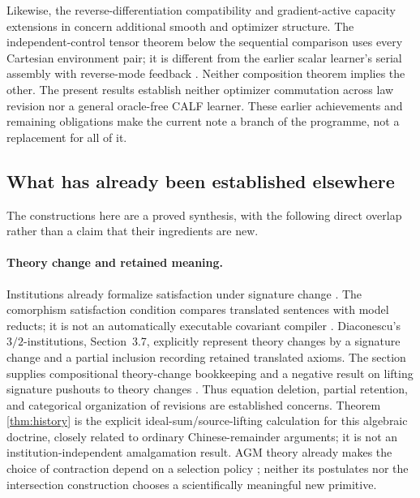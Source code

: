 \documentclass[11pt]{article}
\theoremstyle{definition}
\theoremstyle{remark}\newtheorem{remark}[theorem]{Remark}
\begin{document}
Likewise, the reverse-differentiation compatibility and gradient-active
capacity extensions in \cite{bridge-note,capacity-note} concern additional
smooth and optimizer structure. The independent-control tensor theorem
below the sequential comparison uses every Cartesian environment pair;
it is different from the earlier scalar learner's serial assembly with
reverse-mode feedback \cite{learning-note}. Neither composition theorem
implies the other. The present results establish neither optimizer
commutation across law revision nor a general oracle-free CALF learner.
These earlier achievements and remaining obligations make the current
note a branch of the programme, not a replacement for all of it.

\subsection{What has already been established elsewhere}
The constructions here are a proved synthesis, with the following direct
overlap rather than a claim that their ingredients are new.

\paragraph{Theory change and retained meaning.}
Institutions already formalize satisfaction under signature change
\cite{institutions}. The comorphism satisfaction condition compares
translated sentences with model reducts; it is not an automatically
executable covariant compiler \cite{institution-morphisms}.
Diaconescu's $3/2$-institutions, Section~3.7, explicitly represent theory
changes by a signature change and a partial inclusion recording retained
translated axioms. The section supplies compositional theory-change
bookkeeping and a negative result on lifting signature pushouts to theory
changes \cite{diaconescu}. Thus equation deletion, partial retention, and
categorical organization of revisions are established concerns. Theorem
\ref{thm:history} is the explicit ideal-sum/source-lifting calculation for
this algebraic doctrine, closely related to ordinary Chinese-remainder
arguments; it is not an institution-independent amalgamation result.
AGM theory already makes the choice of contraction depend on a selection
policy \cite{agm}; neither its postulates nor the intersection construction
chooses a scientifically meaningful new primitive.
\end{document}

